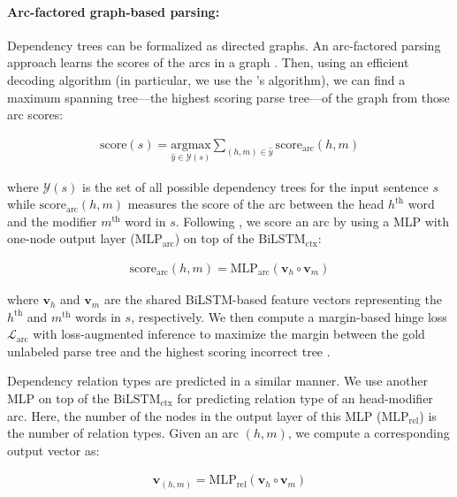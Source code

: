 \documentclass[11pt,letterpaper]{article}
\begin{document}
\paragraph{Arc-factored graph-based parsing:} Dependency trees can be formalized as directed graphs.  
An arc-factored parsing approach learns the scores of the arcs in a graph \citep{Kubler2009}. Then, using an efficient decoding algorithm (in particular, we use the \citet{Eisner:1996}'s   algorithm), we can find a maximum spanning tree---the highest scoring parse tree---of the graph from those arc scores:

\begin{eqnarray*}
\mathrm{score}(s) =   \underset{\hat{y} \in \mathcal{Y}(s)}{\mathrm{argmax}} \sum\limits_{(h, m) \in \hat{y}} \mathrm{score}_{\mathrm{arc}}(h, m)
\end{eqnarray*}

\noindent where $\mathcal{Y}(s)$ is the set of all possible dependency trees for the input sentence $s$ while $\mathrm{score}_{\mathrm{arc}}(h, m)$ measures the score of the arc between the head $h^{\text{th}}$ word and the modifier $m^{\text{th}}$ word in  $s$. Following \citet{TACL885}, we score an arc by using a MLP with one-node output layer ($\mathrm{MLP}_{\mathrm{arc}}$) on top of the $\mathrm{BiLSTM}_{\text{ctx}}$:

  \begin{eqnarray*}
 \mathrm{score}_{\mathrm{arc}}(h, m) = \mathrm{MLP}_{\mathrm{arc}}(\boldsymbol{v}_{h} \circ \boldsymbol{v}_{m})
\end{eqnarray*}

\noindent where $\boldsymbol{v}_{h}$ and $\boldsymbol{v}_{m}$ are the shared BiLSTM-based feature vectors representing the $h^{\text{th}}$  and   $m^{\text{th}}$ words in $s$, respectively.  We then compute a  margin-based hinge loss $\mathcal{L}_{\text{arc}}$ with loss-augmented inference  to maximize the margin between the gold unlabeled parse tree and the highest scoring incorrect tree \citep{TACL885}.


Dependency relation types are  predicted in a similar manner. We use another MLP on top of the $\mathrm{BiLSTM}_{\text{ctx}}$ for predicting relation type of an head-modifier  arc. Here, the number of the nodes in the output layer of this MLP ($\mathrm{MLP}_{\mathrm{rel}}$) is the number of relation types.  Given an arc $(h, m)$, we compute a corresponding  output vector as:

  \begin{eqnarray*}
{\textbf{v}}_{(h,m)} = \mathrm{MLP}_{\mathrm{rel}}(\boldsymbol{v}_{h} \circ \boldsymbol{v}_{m}) 
\end{eqnarray*}
\end{document}
